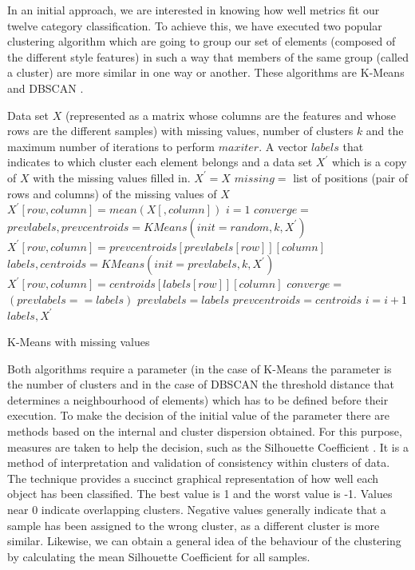 In an initial approach, we are interested in knowing how well metrics fit our twelve category classification. To achieve this, we have executed two popular clustering algorithm which are going to group our set of elements (composed of the different style features) in such a way that members of the same group (called a cluster) are more similar in one way or another. These algorithms are K-Means \citep{hartigan1975clustering} and DBSCAN \citep{ester1996density}.

\begin{algorithm}
	\begin{algorithmic}[1]
		\REQUIRE Data set $X$ (represented as a matrix whose columns are the features and whose rows are the different samples) with missing values, number of clusters $k$ and the maximum number of iterations to perform $maxiter$.
		\ENSURE A vector $labels$ that indicates to which cluster each element belongs and a data set $X^\prime$ which is a copy of $X$ with the missing values filled in.
		\STATE $X^\prime = X$
		\STATE $missing = $ list of positions (pair of rows and columns) of the missing values of $X$
		\STATE $X^\prime[row, column] = mean(X[, column])$
		\ENDFOR
		\STATE $i = 1$
		\STATE $converge =$ \FALSE
		\STATE $prevlabels, prevcentroids = KMeans(init = random, k, X^\prime)$
		\STATE $X^\prime[row, column] = prevcentroids[prevlabels[row]][column]$
		\ENDFOR
		\STATE $labels, centroids = KMeans(init = prevlabels, k, X^\prime)$
		\STATE $X^\prime[row, column] = centroids[labels[row]][column]$
		\ENDFOR
		\STATE $converge =$ $(prevlabels == labels)$
		\STATE $prevlabels = labels$
		\STATE $prevcentroids = centroids$
		\STATE $i = i + 1$
		\ENDIF
		\ENDWHILE
		\RETURN $labels, X^\prime$
	\end{algorithmic}
	\caption{K-Means with missing values}\label{alg:kpod}
\end{algorithm}

Both algorithms require a parameter (in the case of K-Means the parameter is the number of clusters and in the case of DBSCAN the threshold distance that determines a neighbourhood of elements) which has to be defined before their execution. To make the decision of the initial value of the parameter there are methods based on the internal and cluster dispersion obtained. For this purpose, measures are taken to help the decision, such as the Silhouette Coefficient \citep{rousseeuw1987silhouettes}. It is a method of interpretation and validation of consistency within clusters of data. The technique provides a succinct graphical representation of how well each object has been classified. The best value is 1 and the worst value is -1. Values near 0 indicate overlapping clusters. Negative values generally indicate that a sample has been assigned to the wrong cluster, as a different cluster is more similar. Likewise, we can obtain a general idea of the behaviour of the clustering by calculating the mean Silhouette Coefficient for all samples.

